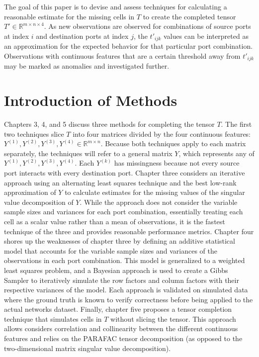 \documentclass[12pt,twoside]{dukestatscithesis}
\theoremstyle{definition}
\theoremstyle{definition}
\theoremstyle{definition}
\theoremstyle{remark}
\begin{document}
The goal of this paper is to devise and assess techniques for
calculating a reasonable estimate for the missing cells in \(T\) to
create the completed tensor \(T' \in \mathbb{R}^{m \times n \times 4}\).
As new observations are observed for combinations of source ports at
index \(i\) and destination ports at index \(j\), the \(t'_{ijk}\)
values can be interpreted as an approximation for the expected behavior
for that particular port combination. Observations with continuous
features that are a certain threshold away from \(t'_{ijk}\) may be
marked as anomalies and investigated further.

\section{Introduction of Methods}\label{introduction-of-methods}

Chapters 3, 4, and 5 discuss three methods for completing the tensor
\(T\). The first two techniques slice \(T\) into four matrices divided
by the four continuous features:
\(Y^{(1)}, Y^{(2)}, Y^{(3)}, Y^{(4)} \in \mathbb{R}^{m \times n}\).
Because both techniques apply to each matrix separately, the techniques
will refer to a general matrix \(Y\), which represents any of
\(Y^{(1)}, Y^{(2)}, Y^{(3)}, Y^{(4)}\). Each \(Y^{(k)}\) has missingness
because not every source port interacts with every destination port.
Chapter three considers an iterative approach using an alternating least
squares technique and the best low-rank approximation of \(Y\) to
calculate estimates for the missing values of the singular value
decomposition of \(Y\). While the approach does not consider the
variable sample sizes and variances for each port combination,
essentially treating each cell as a scalar value rather than a mean of
observations, it is the fastest technique of the three and provides
reasonable performance metrics. Chapter four shores up the weaknesses of
chapter three by defining an additive statistical model that accounts
for the variable sample sizes and variances of the observations in each
port combination. This model is generalized to a weighted least squares
problem, and a Bayesian approach is used to create a Gibbs Sampler to
iteratively simulate the row factors and column factors with their
respective variances of the model. Each approach is validated on
simulated data where the ground truth is known to verify correctness
before being applied to the actual networks dataset. Finally, chapter
five proposes a tensor completion technique that simulates cells in
\(T\) without slicing the tensor. This approach allows considers
correlation and collinearity between the different continuous features
and relies on the PARAFAC tensor decomposition (as opposed to the
two-dimensional matrix singular value decomposition).
\end{document}
